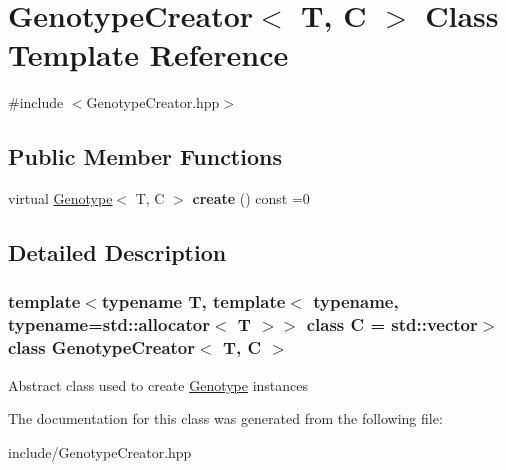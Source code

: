 \hypertarget{classGenotypeCreator}{\section{Genotype\+Creator$<$ T, C $>$ Class Template Reference}
\label{classGenotypeCreator}
}


{\ttfamily \#include $<$Genotype\+Creator.\+hpp$>$}

\subsection*{Public Member Functions}
\begin{DoxyCompactItemize}
\item 
\hypertarget{classGenotypeCreator_abba81dce2e60645fd215b72ccf36e726}{virtual \hyperlink{classGenotype}{Genotype}$<$ T, C $>$ {\bfseries create} () const =0}\label{classGenotypeCreator_abba81dce2e60645fd215b72ccf36e726}

\end{DoxyCompactItemize}


\subsection{Detailed Description}
\subsubsection*{template$<$typename T, template$<$ typename, typename=std\+::allocator$<$ T $>$$>$ class C = std\+::vector$>$class Genotype\+Creator$<$ T, C $>$}

Abstract class used to create \hyperlink{classGenotype}{Genotype} instances 

The documentation for this class was generated from the following file\+:\begin{DoxyCompactItemize}
\item 
include/Genotype\+Creator.\+hpp\end{DoxyCompactItemize}
